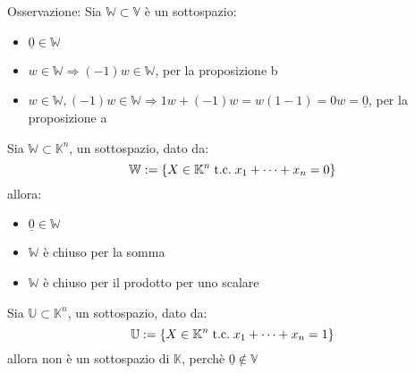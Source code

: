 \documentclass[a4paper,12pt]{article}
\begin{document}
	Osservazione: Sia $\mathbb{W} \subset \mathbb{V}$ è un sottospazio:
	\begin{itemize}
		\item $\underline{0} \in \mathbb{W}$
		\item $w \in \mathbb{W} \Rightarrow (-1)w \in \mathbb{W}$, per la proposizione b
		\item $w \in \mathbb{W}, (-1)w \in \mathbb{W} \Rightarrow 1w + (-1)w = w(1 - 1) = 0w = \underline{0}$, per la proposizione a
	\end{itemize}
	
	Sia $\mathbb{W} \subset \mathbb{K}^n$, un sottospazio, dato da:
	\[\mathbb{W} := \{X \in \mathbb{K}^n \;\text{t.c.}\; x_1 + \dots + x_n = 0\}\]
	allora:
	\begin{itemize}
		\item $\underline{0} \in \mathbb{W}$
		\item $\mathbb{W}$ è chiuso per la somma
		\item $\mathbb{W}$ è chiuso per il prodotto per uno scalare
	\end{itemize}
	
	Sia $\mathbb{U} \subset \mathbb{K}^n$, un sottospazio, dato da:
	\[\mathbb{U} := \{X \in \mathbb{K}^n \;\text{t.c.}\; x_1 + \dots + x_n = 1\}\]
	allora non è un sottospazio di $\mathbb{K}$, perchè $\underline{0} \not \in \mathbb{V}$
	
	
\end{document}
